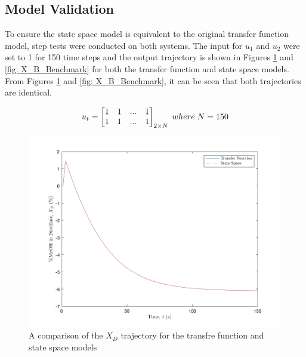 \subsection{Model Validation}

To ensure the state space model is equivalent to the original transfer function model, step tests were conducted on both systems.  The input for $u_1$ and $u_2$ were set to 1 for 150 time steps and the output trajectory is shown in Figures \ref{fig: X_D_Benchmark} and \ref{fig: X_B_Benchmark} for both the transfer function and state space models. From Figures \ref{fig: X_D_Benchmark} and \ref{fig: X_B_Benchmark}, it can be seen that both trajectories are identical. 

\begin{equation}
    \centering
    u_t = 
    \begin{bmatrix}
        1  &  1  &  ...  &  1 \\
        1  &  1  &  ...  &  1
    \end{bmatrix}_{2 \times N}
    \; where \; N = 150
    \label{eq: step_test_input}
\end{equation}

\begin{figure}[h]
    \centering
    \includegraphics[scale=0.35]{images/X_D_Benchmark.png}
    \caption{A comparison of the $X_D$ trajectory for the transfre function and state space models}
    \label{fig: X_D_Benchmark}
\end{figure}

